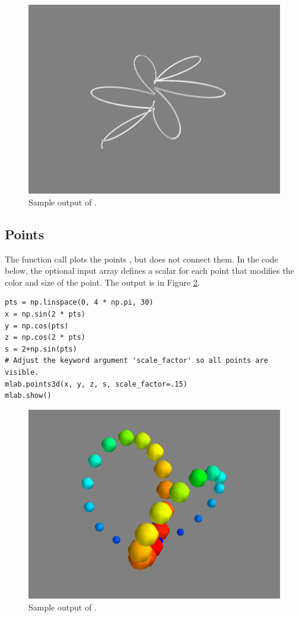 \begin{figure}
\includegraphics[width=.7\textwidth]{plot3d.png}
\caption{Sample output of .}
\label{fig:plot3d}
\end{figure}


\subsection*{Points}
The function call  plots the points , but does not connect them. 
In the code below, the optional input array  defines a scalar for each point that modifies the color and size of the point.
The output is in Figure \ref{fig:points3d}.

\begin{lstlisting}
pts = np.linspace(0, 4 * np.pi, 30)
x = np.sin(2 * pts)
y = np.cos(pts)
z = np.cos(2 * pts)
s = 2+np.sin(pts)
# Adjust the keyword argument 'scale_factor' so all points are visible.
mlab.points3d(x, y, z, s, scale_factor=.15)
mlab.show()
\end{lstlisting}

\begin{figure}
\includegraphics[width=.7\textwidth]{points3d.png}
\caption{Sample output of .}
\label{fig:points3d}
\end{figure}


